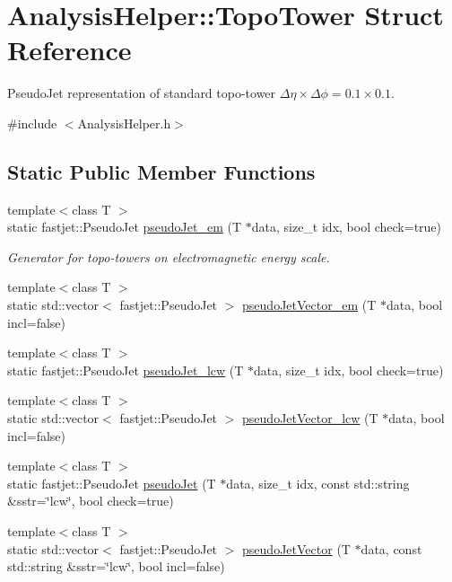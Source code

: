 \hypertarget{structAnalysisHelper_1_1TopoTower}{}\section{Analysis\+Helper\+:\+:Topo\+Tower Struct Reference}
\label{structAnalysisHelper_1_1TopoTower}


Pseudo\+Jet representation of standard topo-\/tower $ \Delta\eta\times\Delta\phi = 0.1\times 0.1 $.  




{\ttfamily \#include $<$Analysis\+Helper.\+h$>$}

\subsection*{Static Public Member Functions}
\begin{DoxyCompactItemize}
\item 
{\footnotesize template$<$class T $>$ }\\static fastjet\+::\+Pseudo\+Jet \hyperlink{structAnalysisHelper_1_1TopoTower_a809a9d1d715a6496f7794a2995c90354}{pseudo\+Jet\+\_\+em} (T $\ast$data, size\+\_\+t idx, bool check=true)
\begin{DoxyCompactList}\small\item\em Generator for topo-\/towers on electromagnetic energy scale. \end{DoxyCompactList}\item 
{\footnotesize template$<$class T $>$ }\\static std\+::vector$<$ fastjet\+::\+Pseudo\+Jet $>$ \hyperlink{structAnalysisHelper_1_1TopoTower_ae278dbc88a69e9c2923741c1698091dd}{pseudo\+Jet\+Vector\+\_\+em} (T $\ast$data, bool incl=false)
\item 
{\footnotesize template$<$class T $>$ }\\static fastjet\+::\+Pseudo\+Jet \hyperlink{structAnalysisHelper_1_1TopoTower_afd149ba166f00053329c8177b589b537}{pseudo\+Jet\+\_\+lcw} (T $\ast$data, size\+\_\+t idx, bool check=true)
\item 
{\footnotesize template$<$class T $>$ }\\static std\+::vector$<$ fastjet\+::\+Pseudo\+Jet $>$ \hyperlink{structAnalysisHelper_1_1TopoTower_a5e59bf161c269548b66e8c03a686dfe8}{pseudo\+Jet\+Vector\+\_\+lcw} (T $\ast$data, bool incl=false)
\item 
{\footnotesize template$<$class T $>$ }\\static fastjet\+::\+Pseudo\+Jet \hyperlink{structAnalysisHelper_1_1TopoTower_abffe1bf17c9af28575e3b17de077386b}{pseudo\+Jet} (T $\ast$data, size\+\_\+t idx, const std\+::string \&sstr=\char`\"{}lcw\char`\"{}, bool check=true)
\item 
{\footnotesize template$<$class T $>$ }\\static std\+::vector$<$ fastjet\+::\+Pseudo\+Jet $>$ \hyperlink{structAnalysisHelper_1_1TopoTower_a08ba9fc95092fad750bfcee5140443a3}{pseudo\+Jet\+Vector} (T $\ast$data, const std\+::string \&sstr=\char`\"{}lcw\char`\"{}, bool incl=false)
\end{DoxyCompactItemize}


